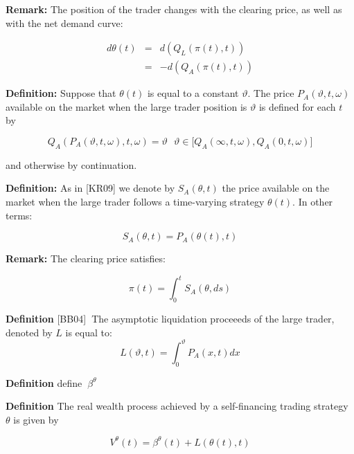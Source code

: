 \documentclass{article}
\begin{document}
\bigskip

\textbf{Remark: }The position of the trader changes with the clearing price,
as well as with the net demand curve:

\begin{eqnarray}
d\theta (t) &=&d(Q_{L}(\pi (t),t))  \label{theta_1} \\
&=&-d(Q_{A}(\pi (t),t))  \label{theta_2}
\end{eqnarray}

\textbf{Definition: }Suppose that $\theta (t)$ is equal to a constant $%
\vartheta $. The price $P_{A}(\vartheta ,t,\omega )$ available on the market
when the large trader position is $\vartheta $ is defined for each $t$ by

\begin{equation*}
Q_{A}(P_{A}(\vartheta ,t,\omega ),t,\omega )=\vartheta \text{ \ \ }\vartheta
\in \lbrack Q_{A}(\infty ,t,\omega ),Q_{A}(0,t,\omega )]
\end{equation*}

and otherwise by continuation.

\textbf{Definition:} As in [KR09] we denote by $S_{A}(\theta ,t)$ the price
available on the market when the large trader follows a time-varying
strategy $\theta (t)$. In other terms:

\begin{equation*}
S_{A}(\theta ,t)=P_{A}(\theta (t),t)
\end{equation*}

\textbf{Remark: }The clearing price satisfies:

\begin{equation*}
\pi (t)=\int_{0}^{t}S_{A}(\theta ,ds)
\end{equation*}

\textbf{Definition }[BB04]\textbf{\ }The asymptotic liquidation proceeeds of
the large trader, denoted by $L$ is equal to:\ 
\begin{equation*}
L(\vartheta ,t)=\int_{0}^{\vartheta }P_{A}(x,t)dx
\end{equation*}

\textbf{Definition }define\textbf{\ }$\beta ^{\theta }$\bigskip

\textbf{Definition} The real wealth process achieved by a self-financing
trading strategy $\theta $ is given by

\begin{equation*}
V^{\theta }(t)=\beta ^{\theta }(t)+L(\theta (t),t)
\end{equation*}
\end{document}
